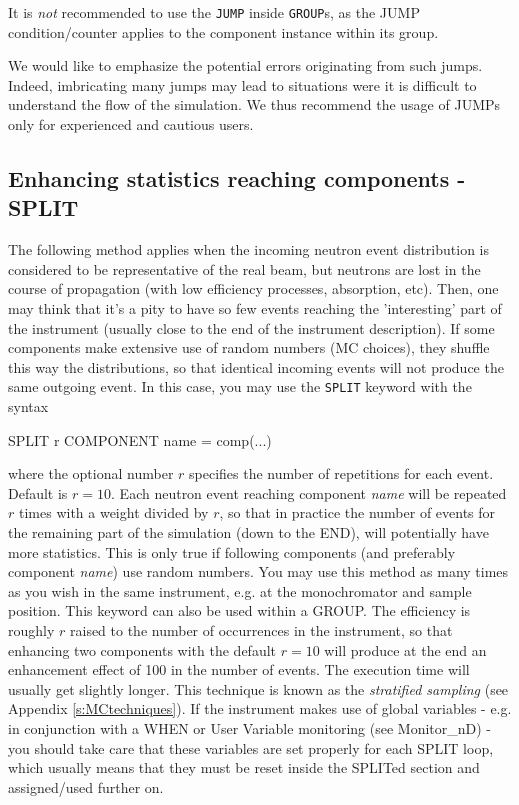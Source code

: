 It is \emph{not} recommended to use the \verb+JUMP+ inside \verb+GROUP+s, as the
JUMP condition/counter applies to the component instance within its group.

We would like to emphasize the potential errors originating from such
jumps. Indeed, imbricating many jumps may lead to situations were it is
difficult to understand the flow of the simulation. We thus recommend the usage
of JUMPs only for experienced and cautious users.

\subsection{Enhancing statistics reaching components - SPLIT}
\label{s:instrdefs-extend-enhance}

The following method applies when the incoming neutron event distribution is
considered to be representative of the real beam, but neutrons are lost in the
course of propagation (with low efficiency processes, absorption, etc). Then,
one may think that it's a pity to have so few events reaching the 'interesting'
part of the instrument (usually close to the end of the instrument description).
If some components make extensive use of random numbers (MC choices), they
shuffle this way the distributions, so that identical incoming events will not
produce the same outgoing event. In this case, you may use the \verb+SPLIT+
keyword with the syntax

\begin{mcstas}
  SPLIT r COMPONENT name = comp(...)
\end{mcstas}

where the optional number $r$ specifies the number of repetitions for each
event. Default is $r=10$.  Each neutron event reaching component \textit{name} will
be repeated $r$ times with a weight divided by $r$, so that in practice the
number of events for the remaining part of the simulation (down to the END),
will potentially have more statistics. This is only true if following components
(and preferably component \textit{name}) use random numbers. You may use this
method as many times as you wish in the same instrument, e.g. at the
monochromator and sample position. This keyword can also be used within a
GROUP. The efficiency is roughly $r$ raised to the number of occurrences in the
instrument, so that enhancing two components with the default $r=10$ will
produce at the end an enhancement effect of 100 in the number of events. The
execution time will usually get slightly longer. This technique is known as the
\emph{stratified sampling} (see Appendix \ref{s:MCtechniques}). If the
instrument makes use of global variables - e.g. in conjunction with a WHEN or
User Variable monitoring (see Monitor\_nD) - you should take care that these
variables are set properly for each SPLIT loop, which usually means that they
must be reset inside the SPLITed section and assigned/used further
on. 

